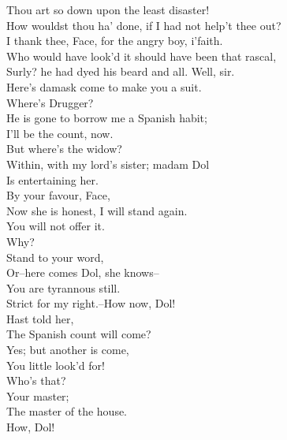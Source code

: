 \documentclass{memoir}
\begin{document}
\begin{drama*}
 Thou art so down upon the least disaster!\\
 How wouldst thou ha' done, if I had not help't thee out?\\
\subtlespeaks  I thank thee, Face, for the angry boy, i'faith.\\
\facespeaks  Who would have look'd it should have been that rascal,\\
 Surly? he had dyed his beard and all. Well, sir.\\
 Here's damask come to make you a suit.\\
\subtlespeaks {} Where's Drugger?\\
\facespeaks  He is gone to borrow me a Spanish habit;\\
 I'll be the count, now.\\
\subtlespeaks {} But where's the widow?\\
\facespeaks  Within, with my lord's sister; madam Dol\\
 Is entertaining her.\\
\subtlespeaks {} By your favour, Face,\\
 Now she is honest, I will stand again.\\
\facespeaks  You will not offer it.\\
\subtlespeaks {} Why?\\
\facespeaks {} Stand to your word,\\
 Or--here comes Dol, she knows--\\
\subtlespeaks {} You are tyrannous still.\\
\facespeaks  Strict for my right.--How now, Dol!\\
Hast  told her,\\
 The Spanish count will come?\\
\dolspeaks {} Yes; but another is come,\\
 You little look'd for!\\
\facespeaks {} Who's that?\\
\dolspeaks {} Your master;\\
 The master of the house.\\
\subtlespeaks {} How, Dol!\\

\end{drama*}
\end{document}
